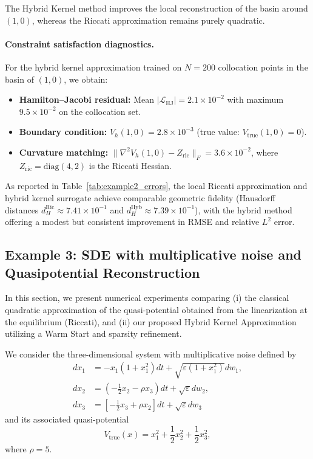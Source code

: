 \documentclass[11pt]{article}
\theoremstyle{plain}      %
\theoremstyle{definition} %
\begin{document}
 The Hybrid Kernel
method improves the local reconstruction of the basin around $(1,0)$, whereas
the Riccati approximation remains purely quadratic. 

\paragraph{Constraint satisfaction diagnostics.}
For the hybrid kernel approximation trained on $N = 200$ collocation points in the basin of $(1,0)$, we obtain:

\begin{itemize}
\item \textbf{Hamilton--Jacobi residual:} Mean $|\mathcal{L}_{\text{HJ}}| = 2.1 \times 10^{-2}$ with maximum $9.5 \times 10^{-2}$ on the collocation set.

\item \textbf{Boundary condition:} $V_h(1,0) = 2.8 \times 10^{-3}$ (true value: $V_{\text{true}}(1,0) = 0$).

\item \textbf{Curvature matching:} $\|\nabla^2 V_h(1,0) - Z_{\text{ric}}\|_F = 3.6 \times 10^{-2}$, where $Z_{\text{ric}} = \text{diag}(4, 2)$ is the Riccati Hessian.
\end{itemize}

As reported in Table~\ref{tab:example2_errors}, the local Riccati approximation and hybrid kernel surrogate achieve comparable geometric fidelity (Hausdorff distances $d_H^{\text{Ric}} \approx 7.41 \times 10^{-1}$ and $d_H^{\text{Hyb}} \approx 7.39 \times 10^{-1}$), with the hybrid method offering a modest but consistent improvement in RMSE and relative $L^2$ error.

 \iffalse
 \subsection{Example 3: SDE with multiplicative noise and Quasipotential Reconstruction}
\label{sec:example3_kernels}

In this section, we present numerical experiments comparing (i) the classical quadratic approximation of the quasi-potential obtained from the linearization at the equilibrium (Riccati), and (ii) our proposed Hybrid Kernel Approximation utilizing a Warm Start and sparsity refinement.

We consider the three-dimensional system with multiplicative noise defined by
\begin{equation}\label{sde3}
\begin{aligned}
    dx_1 &= -x_1 (1+x_1^2)dt + \sqrt{\varepsilon (1+x_1^2)} dw_1, \\
    dx_2 &= (-\frac{1}{2}x_2 - \rho x_3)dt + \sqrt{\varepsilon} dw_2, \\
    dx_3 &= [-\frac{1}{2}x_3 + \rho x_2]dt + \sqrt{\varepsilon} dw_3
\end{aligned}
\end{equation}
and its associated quasi-potential
\begin{equation}\label{eq3:Q-def}
V_{\text{true}}(x) = x_1^2 + \frac{1}{2} x_2^2 + \frac{1}{2} x_3^2,
\end{equation}
where $\rho=5$.
\end{document}
